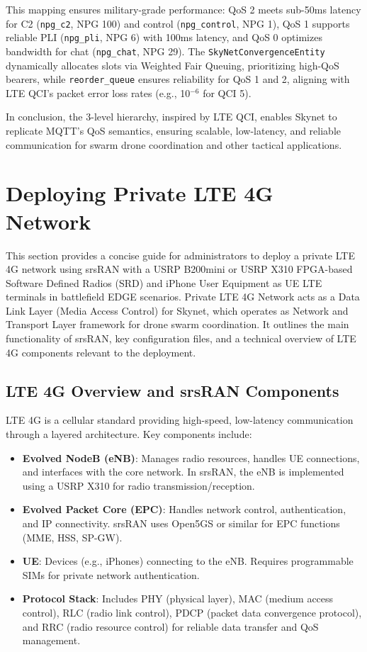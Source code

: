 \documentclass{article}
\begin{document}
This mapping ensures military-grade performance: QoS 2 meets sub-50ms latency for C2 (\texttt{npg\_c2},
NPG 100) and control (\texttt{npg\_control}, NPG 1), QoS 1 supports reliable PLI (\texttt{npg\_pli},
NPG 6) with 100ms latency, and QoS 0 optimizes bandwidth for chat (\texttt{npg\_chat}, NPG 29). The
\texttt{SkyNetConvergenceEntity} dynamically allocates slots via Weighted Fair Queuing, prioritizing
high-QoS bearers, while \texttt{reorder\_queue} ensures reliability for QoS 1 and 2, aligning with
LTE QCI’s packet error loss rates (e.g., 10$^{-6}$ for QCI 5).

In conclusion, the 3-level hierarchy, inspired by LTE QCI, enables Skynet to replicate MQTT’s QoS
semantics, ensuring scalable, low-latency, and reliable communication for swarm drone coordination and
other tactical applications.

\newpage
\section{Deploying Private LTE 4G Network}
This section provides a concise guide for administrators to deploy a private LTE 4G network
using srsRAN with a USRP B200mini or USRP X310 FPGA-based Software Defined Radios (SRD)
and iPhone User Equipment as UE LTE terminals in battlefield EDGE scenarios.
Private LTE 4G Network acts as a Data Link Layer (Media Access Control) for Skynet,
which operates as Network and Transport Layer framework for drone swarm coordination.
It outlines the main functionality of srsRAN, key configuration files, and a technical
overview of LTE 4G components relevant to the deployment.

\subsection{LTE 4G Overview and srsRAN Components}
LTE 4G is a cellular standard providing high-speed, low-latency communication through
a layered architecture. Key components include:
\begin{itemize}
\item \textbf{Evolved NodeB (eNB)}: Manages radio resources, handles UE connections, and interfaces with the core network. In srsRAN, the eNB is implemented using a USRP X310 for radio transmission/reception.
\item \textbf{Evolved Packet Core (EPC)}: Handles network control, authentication, and IP connectivity. srsRAN uses Open5GS or similar for EPC functions (MME, HSS, SP-GW).
\item \textbf{UE}: Devices (e.g., iPhones) connecting to the eNB. Requires programmable SIMs for private network authentication.
\item \textbf{Protocol Stack}: Includes PHY (physical layer), MAC (medium access control), RLC (radio link control), PDCP (packet data convergence protocol), and RRC (radio resource control) for reliable data transfer and QoS management.
\end{itemize}
\end{document}
